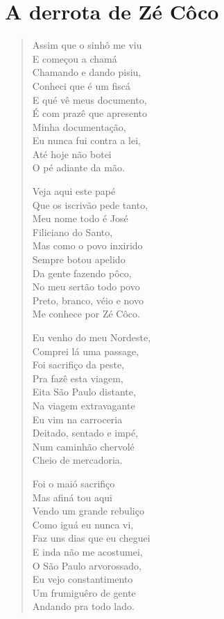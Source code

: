 \chapter{A derrota de Zé Côco}

\begin{verse}
Assim que o sinhô me viu\\
E começou a chamá\\
Chamando e dando pisiu,\\
Conheci que é um fiscá\\
E qué vê meus documento,\\
É com prazê que apresento\\
Minha documentação,\\
Eu nunca fui contra a lei,\\
Até hoje não botei\\
O pé adiante da mão.

Veja aqui este papé\\
Que os iscrivão pede tanto,\\
Meu nome todo é José\\
Filiciano do Santo,\\
Mas como o povo inxirido\\
Sempre botou apelido\\
Da gente fazendo pôco,\\
No meu sertão todo povo\\
Preto, branco, véio e novo\\
Me conhece por Zé Côco.

Eu venho do meu Nordeste,\\
Comprei lá uma passage,\\
Foi sacrifiço da peste,\\
Pra fazê esta viagem,\\
Eita São Paulo distante,\\
Na viagem extravagante\\
Eu vim na carroceria\\
Deitado, sentado e impé,\\
Num caminhão chervolé\\
Cheio de mercadoria.

Foi o maió sacrifiço\\
Mas afiná tou aqui\\
Vendo um grande rebuliço\\
Como iguá eu nunca vi,\\
Faz uns dias que eu cheguei\\
E inda não me acostumei,\\
O São Paulo arvorossado,\\
Eu vejo constantimento\\
Um frumiguêro de gente\\
Andando pra todo lado.


\end{verse}
